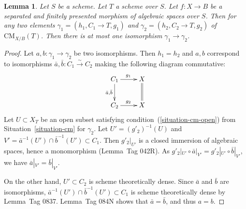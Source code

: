 \documentclass{stacks-project}
\theoremstyle{plain}
\newtheorem{lemma}[subsection]{Lemma}
\theoremstyle{definition}
\theoremstyle{remark}
\numberwithin{equation}{subsection}
\def\CMfunctor{\text{CM}}
\begin{document}
\begin{lemma}\label{cm-fibered-in-setoids}
Let $S$ be a scheme.
Let $T$ a scheme over $S$.
Let $f \colon X \to B$ be a separated and finitely presented morphism of algebraic spaces over $S$.
Then for any two elements $\gamma_1 = (h_1,C_1 \to T,g_1)$ and $\gamma_2 = (h_2,C_2 \to T,g_2)$ of $\CMfunctor_{X/B}(T)$.
Then there is at most one isomorphism $\gamma_1 \to \gamma_2$.
\end{lemma}
\begin{proof}
Let $a,b \colon \gamma_1 \to \gamma_2$ be two isomorphisms.
Then $h_1 = h_2$ and $a,b$ correspond to isomorphisms $\bar{a},\bar{b} \colon C_1 \xrightarrow{\sim} C_2$ making the following diagram commutative:
\[ \xymatrix{
  C_1 \ar[r]^{g_1} \ar[d]_{\bar{a},\bar{b}} & X \ar@{=}[d] \\
C_2 \ar[r]^{g_2} & X
} \]
Let $U \subset X_T$ be an open subset satisfying condition~(\ref{situation-cm-open}) from Situation~\ref{situation-cm} for $\gamma_2$.
Let $U' = (g'_2)^{-1}(U)$ and $V' = \bar{a}^{-1}(U') \cap \bar{b}^{-1}(U') \subset C_1$.
Then $g'_2|_{U'}$ is a closed immersion of algebraic spaces, hence a monomorphism (Lemma~Tag 042R).
As $g'_2|_{U'} \circ \bar{a}|_{V'} = g'_2|_{U'} \circ \bar{b}|_{V'}$, we have $\bar{a}|_{V'} = \bar{b}|_{V'}$.

On the other hand, $U' \subset C_2$ is scheme theoretically dense.
Since $\bar{a}$ and $\bar{b}$ are isomorphisms, $\bar{a}^{-1}(U') \cap \bar{b}^{-1}(U') \subset C_1$ is scheme theoretically dense by Lemma~Tag 0837.
Lemma~Tag 084N shows that $\bar{a} = \bar{b}$, and thus $a = b$.
\end{proof}
\end{document}
